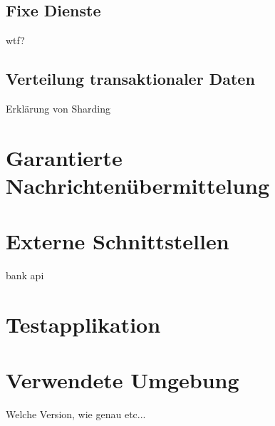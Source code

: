 \subsection{Fixe Dienste}
wtf?
\subsection{Verteilung transaktionaler Daten}
Erklärung von Sharding

\section{Garantierte Nachrichtenübermittelung}

\section{Externe Schnittstellen}
bank api
\section{Testapplikation}

\section{Verwendete Umgebung}
Welche Version, wie genau etc...
